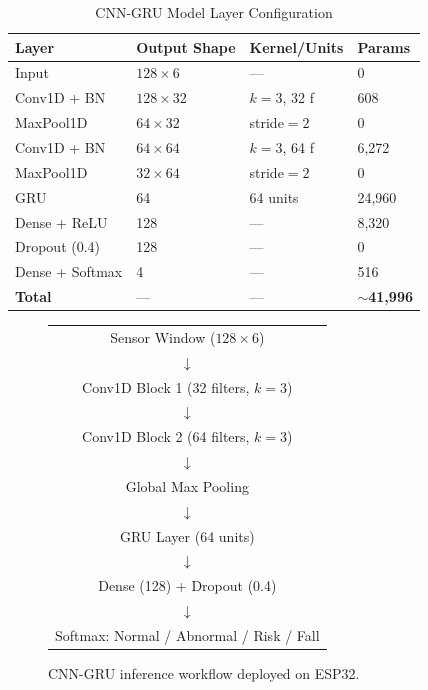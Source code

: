 \documentclass[conference]{IEEEtran}
\begin{document}
\begin{table}[!t]
\caption{CNN-GRU Model Layer Configuration}
\label{tab:model}
\centering
\small
\setlength{\tabcolsep}{4pt}
\renewcommand{\arraystretch}{1.15}
\begin{tabular}{L{2.2cm} C{1.6cm} C{1.5cm} C{1.2cm}}
\toprule
\textbf{Layer} & \textbf{Output Shape} & \textbf{Kernel/Units} & \textbf{Params} \\
\midrule
Input          & $128 \times 6$  & ---            & 0       \\
Conv1D + BN    & $128 \times 32$ & $k{=}3$, 32 f  & 608     \\
MaxPool1D      & $64 \times 32$  & stride$=2$     & 0       \\
Conv1D + BN    & $64 \times 64$  & $k{=}3$, 64 f  & 6{,}272 \\
MaxPool1D      & $32 \times 64$  & stride$=2$     & 0       \\
GRU            & 64              & 64 units       & 24{,}960\\
Dense + ReLU   & 128             & ---            & 8{,}320 \\
Dropout (0.4)  & 128             & ---            & 0       \\
Dense + Softmax & 4              & ---            & 516     \\
\midrule
\textbf{Total} & ---             & ---            & \textbf{${\sim}$41{,}996} \\
\bottomrule
\end{tabular}
\end{table}

\begin{figure}[!t]
\centering
\small
\begin{tabular}{c}
\hline
Sensor Window ($128 \times 6$) \\
$\downarrow$ \\
Conv1D Block 1 (32 filters, $k{=}3$) \\
$\downarrow$ \\
Conv1D Block 2 (64 filters, $k{=}3$) \\
$\downarrow$ \\
Global Max Pooling \\
$\downarrow$ \\
GRU Layer (64 units) \\
$\downarrow$ \\
Dense (128) + Dropout (0.4) \\
$\downarrow$ \\
Softmax: Normal / Abnormal / Risk / Fall \\
\hline
\end{tabular}
\caption{CNN-GRU inference workflow deployed on ESP32.}
\label{fig:pipeline}
\end{figure}
\end{document}

